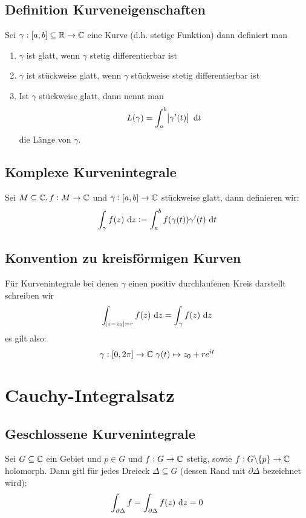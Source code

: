 \subsection{Definition Kurveneigenschaften}
Sei $\gamma: [a,b] \subseteq \mathbb{R} \to \mathbb{C}$ eine Kurve (d.h. stetige Funktion) dann definiert man
\begin{enumerate}
    \item $\gamma$ ist glatt, wenn $\gamma$ stetig differentierbar ist
    \item $\gamma$ ist stückweise glatt, wenn $\gamma$ stückweise stetig differentierbar ist
    \item Ist $\gamma$ stückweise glatt, dann nennt man
        \begin{equation*}
            L(\gamma) = \int_a^b \abs{\gamma'(t)} \text{ d}t
        \end{equation*}
        die Länge von $\gamma$.
\end{enumerate}

\subsection{Komplexe Kurvenintegrale}
Sei $M \subseteq \mathbb{C}, f: M \to \mathbb{C}$ und $\gamma: [a,b] \to \mathbb{C}$ stückweise glatt, dann definieren wir:
\begin{equation*}
    \int_\gamma f(z) \text{ d}z := \int_a^b f(\gamma(t))\gamma'(t) \text{ d}t
\end{equation*}

\subsection{Konvention zu kreisförmigen Kurven}
Für Kurvenintegrale bei denen $\gamma$ einen positiv durchlaufenen Kreis darstellt schreiben wir
\begin{equation*}
    \int_{\abs{z-z_0} = r} f(z) \text{ d}z = \int_\gamma f(z) \text{ d}z 
\end{equation*}
es gilt also:
\begin{equation*}
    \gamma: [0, 2 \pi] \to \mathbb{C}\ \gamma(t) \mapsto z_0 + r e^{it}  
\end{equation*}

\section{Cauchy-Integralsatz}
\subsection{Geschlossene Kurvenintegrale}
Sei $G \subseteq \mathbb{C}$ ein Gebiet und $p \in G$ und $f: G \to \mathbb{C}$ stetig, sowie
$f: G\backslash\{p\} \to \mathbb{C}$ holomorph.
Dann gitl für jedes Dreieck $\Delta \subseteq G$ (dessen Rand mit $\partial \Delta$ bezeichnet wird):
\begin{equation*}
    \int_{\partial \Delta} f = \int_{\partial \Delta} f(z) \text{ d}z = 0 
\end{equation*}

